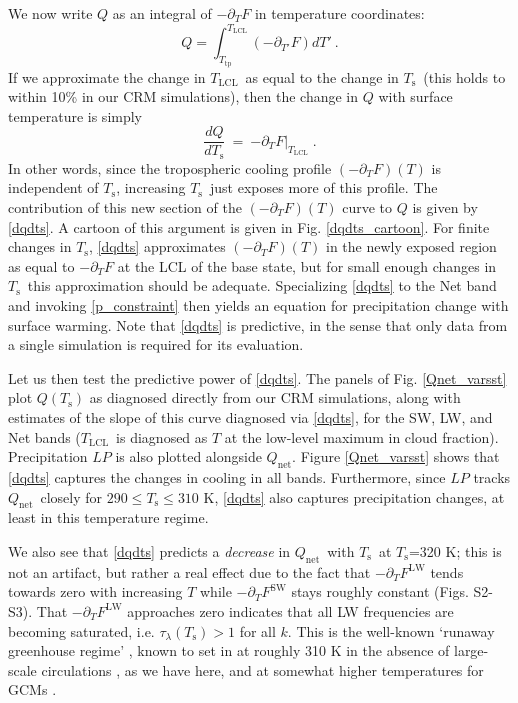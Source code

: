 \documentclass[9pt,twocolumn,twoside,lineno]{pnas-new}
\newcommand{\beqn}{\begin{equation}}
\newcommand{\eeqn}{\end{equation}}
\newcommand{\n}{\nonumber}
\newcommand{\der}[2]{\ensuremath{\frac{d #1}{d #2}}}
\newcommand{\ppt}{\ensuremath{\partial_T}}
\newcommand{\Qnet}{\ensuremath{Q_\mathrm{net}}}
\newcommand{\FLW}{\ensuremath{F^\mathrm{LW}}}
\newcommand{\FSW}{\ensuremath{F^\mathrm{SW}}}
\newcommand{\tauk}{\ensuremath{\tau_\lambda}}
\newcommand{\Ts}{\ensuremath{T_\mathrm{s}}}
\newcommand{\Tlcl}{\ensuremath{T_\mathrm{LCL}}}
\newcommand{\Ttp}{\ensuremath{T_\mathrm{tp}}}
\begin{document}
	  We now write $Q$ as an integral of $-\ppt F$  in temperature coordinates: 
	\beqn
		Q =  \int_{\Ttp}^{\Tlcl} (-\partial_{T'} F) dT' \ . 
		\n
	\eeqn
   If we approximate the change in  \Tlcl\ as equal to the change in \Ts\ (this holds to within 10\% in our CRM simulations), then the change in $Q$ with surface temperature is  simply
	\beqn
		\der{Q}{\Ts} \ =\  \left.  -\ppt F\right|_{\Tlcl}  \; .
	\label{dqdts}
	\eeqn
In other words, since the tropospheric cooling profile $(-\ppt F)(T)$  is independent of \Ts, increasing \Ts\ just exposes more of this profile.  The contribution of this new section of the $(-\ppt F)(T)$ curve to $Q$ is given by \eqref{dqdts}.  A cartoon of this argument is given in Fig. \ref{dqdts_cartoon}. For finite changes in \Ts, \eqref{dqdts} approximates $(-\ppt F)(T)$ in the newly exposed region as equal to $-\ppt F$ at the LCL of the base state, but for small enough changes in \Ts\ this approximation should be adequate. Specializing \eqref{dqdts} to the Net band and invoking \eqref{p_constraint} then yields an equation for precipitation change with surface warming. Note that \eqref{dqdts} is predictive, in the sense that only data from a single simulation is required for its evaluation.

Let us then test the predictive power of \eqref{dqdts}. The panels of Fig. \ref{Qnet_varsst} plot $Q(\Ts)$ as diagnosed directly from our CRM simulations, along with estimates of the slope of this curve diagnosed via   \eqref{dqdts}, for the SW, LW, and Net  bands (\Tlcl\ is diagnosed as $T$ at the low-level maximum in cloud fraction). Precipitation $LP$ is also plotted alongside $\Qnet$.  Figure \ref{Qnet_varsst} shows that \eqref{dqdts}  captures the changes in  cooling in all bands. Furthermore, since $LP$ tracks \Qnet\ closely for $290\leq \Ts \leq 310$ K, \eqref{dqdts} also captures precipitation changes, at least in this temperature regime.

We also see that \eqref{dqdts} predicts a \emph{decrease} in  \Qnet\ with \Ts\ at \Ts=320 K; this is not an artifact, but rather a real effect due to the fact that $-\ppt \FLW$ tends towards zero with increasing $T$  while $-\ppt \FSW$ stays roughly constant (Figs. S2-S3). That $-\ppt \FLW$ approaches zero indicates that all LW frequencies are becoming saturated, i.e. $\tauk(\Ts) > 1$ for all $k$. This is the well-known `runaway greenhouse regime' \citep{pierrehumbert2010},  known to set in at roughly 310 K in the absence of large-scale circulations \citep{goldblatt2013}, as we have here, and at somewhat higher temperatures for GCMs \citep{wolf2014,leconte2013}. 
\end{document}
